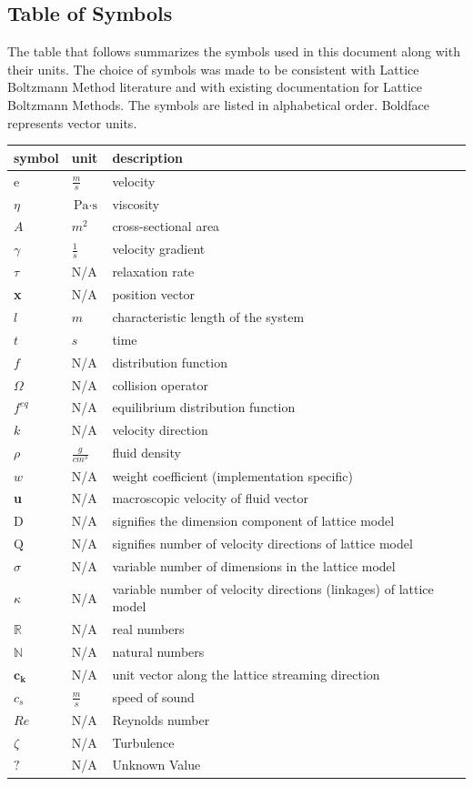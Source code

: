 \documentclass[12pt]{article}
\begin{document}
\subsection{Table of Symbols}

The table that follows summarizes the symbols used in this document along with
their units.  The choice of symbols was made to be consistent with Lattice Boltzmann Method literature and with existing documentation for Lattice Boltzmann Methods. The symbols are listed in alphabetical order. Boldface represents vector units.

\renewcommand{\arraystretch}{1.2}
\noindent \begin{longtable*}{l l p{12cm}} \toprule
\textbf{symbol} & \textbf{unit} & \textbf{description}\\
\midrule 
$\mathrm{e}$ & $\frac{m}{s}$ & velocity
\\
$\eta$ & $\si{\pascal}\cdot\si{\second}$ & viscosity
\\ 
$A$ & $m^2$ & cross-sectional area
\\
$\gamma$ & $\frac{1}{s}$ & velocity gradient
\\
$\tau$ & N/A & relaxation rate
\\
\textbf{x} & N/A & position vector
\\
$l$ & $m$ & characteristic length of the system
\\
$t$ & $s$ & time
\\
$f$ & N/A & distribution function
\\
$\Omega$ & N/A & collision operator
\\
$f^{eq}$ & N/A & equilibrium distribution function
\\
$k$ & N/A & velocity direction
\\
$\rho$ & $\frac{g}{cm^3}$ & fluid density
\\
$w$ & N/A & weight coefficient (implementation specific)
\\
\textbf{u} & N/A & macroscopic velocity of fluid vector
\\
$\mathrm{D}$ & N/A & signifies the dimension component of lattice model
\\
$\mathrm{Q}$ & N/A & signifies number of velocity directions of lattice model
\\
$\sigma$ & N/A & variable number of dimensions in the lattice model
\\
$\kappa$ & N/A & variable number of velocity directions  (linkages) of lattice model
\\
$\mathbb{R}$ & N/A & real numbers
\\
$\mathbb{N}$ & N/A & natural numbers
\\
$\textbf{c}_\textbf{k}$ & N/A & unit vector along the lattice streaming direction
\\
$c_s$ & $\frac{m}{s}$ & speed of sound
\\
$Re$ & N/A & Reynolds number
\\
$\zeta$ & N/A & Turbulence
\\
$?$ & N/A & Unknown Value 
\\
\bottomrule
\end{longtable*}
\end{document}
